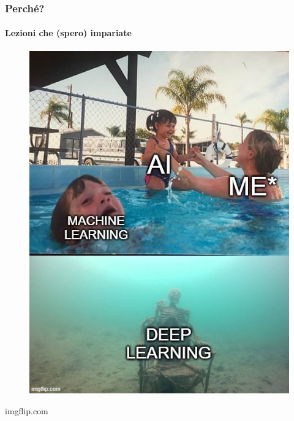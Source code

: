\begin{frame}[t] \frametitle{Perché?}
\framesubtitle{Lezioni che (spero) impariate}
{\scriptsize
    \begin{minipage}[b]{\textwidth}
        \begin{minipage}[b]{0.33\textwidth}
            \centering
            \begin{figure}[ht]
                \includegraphics[width=\textwidth]{img/meme-2.jpg}
            \end{figure}
            \begin{flushright}
                \vspace*{-7pt}
                {\tiny\textcopyright imgflip.com}
            \end{flushright}
        \end{minipage}
        \begin{minipage}[b]{0.33\textwidth}
            \centering
            \begin{figure}[ht]

\end{figure}
\end{minipage}
\end{minipage}}
\end{frame}
